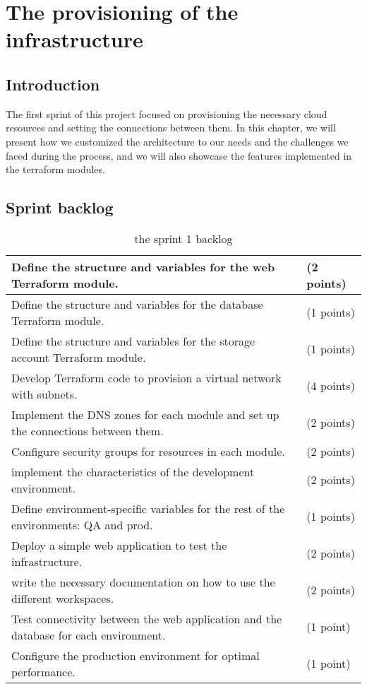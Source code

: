 \chapter{The provisioning of the infrastructure}

\section*{Introduction}
\noindent
The first sprint of this project focused on provisioning the necessary cloud resources and setting the connections between them. In this chapter, we will present how we customized the architecture to our needs and the challenges we faced during the process, and we will also showcase the features implemented in the terraform modules.
\section{Sprint backlog}
\begin{longtable}[c]{
    |p{}|
    p{}|
    }
    \caption{the sprint 1 backlog}
    \label{tab:Sprint1_backlog}                                                                       \\
    \hline
    Define the structure and variables for the web Terraform module.                     & (2 points) \\
    \hline
    Define the structure and variables for the database Terraform module.                & (1 points) \\
    \hline
    Define the structure and variables for the storage account Terraform module.         & (1 points) \\
    \hline
    Develop Terraform code to provision a virtual network with subnets.                  & (4 points) \\
    \hline
    Implement the DNS zones for each module and set up the connections between them.     & (2 points) \\
    \hline
    Configure security groups for resources in each module.                              & (2 points) \\
    \hline
    implement the characteristics of the development environment.                        & (2 points) \\
    \hline
    Define environment-specific variables for the rest of the environments: QA and prod. & (1 points) \\
    \hline
    Deploy a simple web application to test the infrastructure.                          & (2 points) \\
    \hline
    write the necessary documentation on how to use the different workspaces.            & (2 points) \\
    \hline
    Test connectivity between the web application and the database for each environment. & (1 point)  \\
    \hline
    Configure the production environment for optimal performance.                        & (1 point)  \\
    \hline
\end{longtable}

